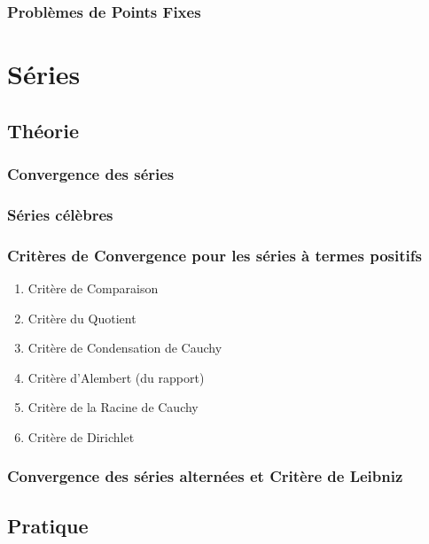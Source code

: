 \documentclass{article}
\begin{document}
\subsubsection{Problèmes de Points Fixes}

\section{Séries}

\subsection{Théorie}

\subsubsection{Convergence des séries}

\subsubsection{Séries célèbres}

\subsubsection{Critères de Convergence pour les séries à termes positifs}

    \begin{enumerate}
	\item Critère de Comparaison
	\item Critère du Quotient
	\item Critère de Condensation de Cauchy
	\item Critère d'Alembert (du rapport)
	\item Critère de la Racine de Cauchy
	\item Critère de Dirichlet
    \end{enumerate}

\subsubsection{Convergence des séries alternées et Critère de Leibniz}


\subsection{Pratique}
\end{document}
